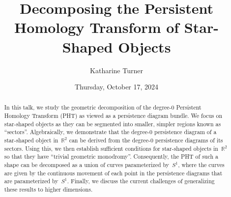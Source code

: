 \documentclass{UAmathtalk}
\author{Katharine Turner}
\title{Decomposing the Persistent Homology Transform of Star-Shaped Objects}
\date{Thursday, October 17, 2024}
\begin{document}
\maketitle

\begin{abstract}
In this talk, we study the geometric decomposition of the \mbox{degree-$0$} Persistent Homology Transform (PHT) as viewed as a persistence diagram bundle. We focus on star-shaped objects as they can be segmented into smaller, simpler regions known as “sectors”. Algebraically, we demonstrate that the degree-$0$ persistence diagram of a star-shaped object in~$\mathbb{R}^2$ can be derived from the degree-$0$ persistence diagrams of its sectors. Using this, we then establish sufficient conditions for star-shaped objects in~$\mathbb{R}^2$ so that they have “trivial geometric monodromy”. Consequently, the PHT of such a shape can be decomposed as a union of curves parameterized by~$S^1$, where the curves are given by the continuous movement of each point in the persistence diagrams that are parameterized by~$S^1$. Finally, we discuss the current challenges of generalizing these results to higher dimensions.
\end{abstract}
\end{document}
